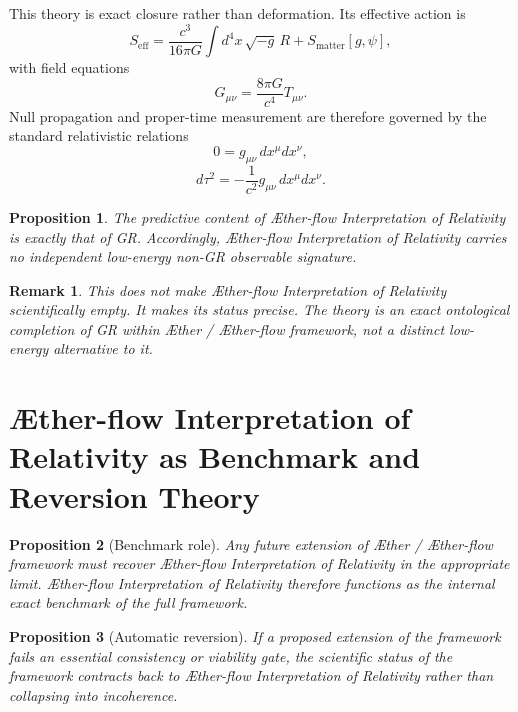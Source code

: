 \documentclass[11pt]{article}
\newcommand{\Aether}{\AE{}ther}
\newcommand{\Aflow}{\AE{}ther-flow}
\newcommand{\TheoryName}{\Aflow{} Interpretation of Relativity}
\newcommand{\TheoryProgram}{\Aether{} / \Aflow{} framework}
\newtheorem{proposition}{Proposition}
\newtheorem{remark}{Remark}
\begin{document}
This theory is exact closure rather than deformation. Its effective action is
\begin{equation}
S_{\mathrm{eff}}
=
\frac{c^3}{16\pi G}\int d^4x\,\sqrt{-g}\,R
+
S_{\mathrm{matter}}[g,\psi],
\label{eq:SA}
\end{equation}
with field equations
\begin{equation}
G_{\mu\nu} = \frac{8\pi G}{c^4} T_{\mu\nu}.
\label{eq:einstein}
\end{equation}
Null propagation and proper-time measurement are therefore governed by the standard relativistic relations
\begin{equation}
0 = g_{\mu\nu}\,dx^{\mu}dx^{\nu},
\label{eq:null}
\end{equation}
\begin{equation}
d\tau^2 = -\frac{1}{c^2} g_{\mu\nu}\,dx^{\mu}dx^{\nu}.
\label{eq:propertime}
\end{equation}

\begin{proposition}
The predictive content of \TheoryName{} is exactly that of GR. Accordingly, \TheoryName{} carries no independent low-energy non-GR observable signature.
\end{proposition}

\begin{remark}
This does not make \TheoryName{} scientifically empty. It makes its status precise. The theory is an exact ontological completion of GR within \TheoryProgram{}, not a distinct low-energy alternative to it.
\end{remark}

\section{\TheoryName{} as Benchmark and Reversion Theory}

\begin{proposition}[Benchmark role]
Any future extension of \TheoryProgram{} must recover \TheoryName{} in the appropriate limit. \TheoryName{} therefore functions as the internal exact benchmark of the full framework.
\end{proposition}

\begin{proposition}[Automatic reversion]
If a proposed extension of the framework fails an essential consistency or viability gate, the scientific status of the framework contracts back to \TheoryName{} rather than collapsing into incoherence.
\end{proposition}
\end{document}
